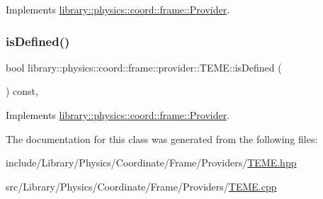 Implements \hyperlink{classlibrary_1_1physics_1_1coord_1_1frame_1_1_provider_a796fd2dd337f1304a0e9acf573ce2550}{library\+::physics\+::coord\+::frame\+::\+Provider}.

\mbox{\label{classlibrary_1_1physics_1_1coord_1_1frame_1_1provider_1_1_t_e_m_e_a8c52ea8c59a669197234383e4bfa54b6}} 
\subsubsection{\texorpdfstring{is\+Defined()}{isDefined()}}
{\footnotesize\ttfamily bool library\+::physics\+::coord\+::frame\+::provider\+::\+T\+E\+M\+E\+::is\+Defined (\begin{DoxyParamCaption}{ }\end{DoxyParamCaption}) const\hspace{0.3cm}{\ttfamily [override]}, {\ttfamily [virtual]}}



Implements \hyperlink{classlibrary_1_1physics_1_1coord_1_1frame_1_1_provider_ae7cd093febf2b20f71400f9f79442774}{library\+::physics\+::coord\+::frame\+::\+Provider}.



The documentation for this class was generated from the following files\+:\begin{DoxyCompactItemize}
\item 
include/\+Library/\+Physics/\+Coordinate/\+Frame/\+Providers/\hyperlink{_t_e_m_e_8hpp}{T\+E\+M\+E.\+hpp}\item 
src/\+Library/\+Physics/\+Coordinate/\+Frame/\+Providers/\hyperlink{_t_e_m_e_8cpp}{T\+E\+M\+E.\+cpp}\end{DoxyCompactItemize}
